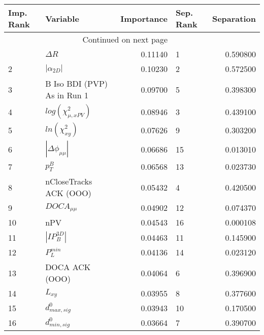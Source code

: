 \usepackage{lscape}

\begin{landscape}
\begin{longtable}{llrlr}
\toprule
Imp. Rank &                     Variable &  Importance & Sep. Rank &  Separation \\
\midrule
\endhead
\midrule
\multicolumn{3}{r}{{Continued on next page}} \\
\midrule
\endfoot

\bottomrule
\endlastfoot
        1 &                   $\Delta R$ &     0.11140 &         1 &    0.590800 \\
        2 &              $|\alpha_{2D}|$ &     0.10230 &         2 &    0.572500 \\
        3 &  B Iso BDI (PVP) As in Run 1 &     0.09700 &         5 &    0.398300 \\
        4 &    $log(\chi^{2}_{\mu,xPV})$ &     0.08946 &         3 &    0.439100 \\
        5 &          $ln(\chi^{2}_{xy})$ &     0.07626 &         9 &    0.303200 \\
        6 &     $|\Delta \phi_{\mu\mu}|$ &     0.06686 &        15 &    0.013010 \\
        7 &                    $p^B_{T}$ &     0.06568 &        13 &    0.023730 \\
        8 &       nCloseTracks ACK (OOO) &     0.05432 &         4 &    0.420500 \\
        9 &              $DOCA_{\mu\mu}$ &     0.04902 &        12 &    0.074370 \\
       10 &                          nPV &     0.04543 &        16 &    0.000108 \\
       11 &              $|IP_{B}^{3D}|$ &     0.04463 &        11 &    0.145900 \\
       12 &                $P^{min}_{L}$ &     0.04136 &        14 &    0.023120 \\
       13 &               DOCA ACK (OOO) &     0.04064 &         6 &    0.396900 \\
       14 &                     $L_{xy}$ &     0.03955 &         8 &    0.377600 \\
       15 &             $d^0_{max, sig}$ &     0.03943 &        10 &    0.170500 \\
       16 &             $d^0_{min, sig}$ &     0.03664 &         7 &    0.390700 \\
\end{longtable}

\end{landscape}
